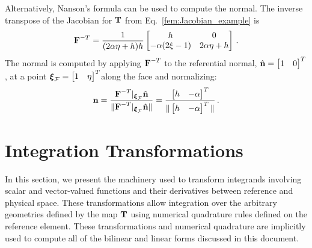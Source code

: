 \documentclass[../doc.tex]{subfiles}
\begin{document}
Alternatively, Nanson's formula can be used to compute the normal. The inverse transpose of the Jacobian for $\boldsymbol{\mathrm{T}}$ from Eq.~\ref{fem:Jacobian_example} is 
	\begin{equation}
		\boldsymbol{\mathrm{F}}^{-T} = \frac{1}{(2\alpha \eta + h)h} \begin{bmatrix} 
			h & 0 \\ 
			-\alpha(2\xi-1) & 2\alpha\eta+h
		\end{bmatrix} \,. 
	\end{equation}
The normal is computed by applying $\boldsymbol{\mathrm{F}}^{-T}$ to the referential normal, $\hat{\boldsymbol{\mathrm{n}}} = \begin{bmatrix} 1&0 \end{bmatrix}^T$, at a point $\boldsymbol{\xi}_\mathcal{F} = \begin{bmatrix} 1 & \eta \end{bmatrix}^T$along the face and normalizing: 
	\begin{equation}
		\boldsymbol{\mathrm{n}} = \frac{\boldsymbol{\mathrm{F}}^{-T}|_{\boldsymbol{\xi}_\mathcal{F}}\hat{\boldsymbol{\mathrm{n}}}}{\|\boldsymbol{\mathrm{F}}^{-T}|_{\boldsymbol{\xi}_\mathcal{F}}\hat{\boldsymbol{\mathrm{n}}}\|} = \frac{\begin{bmatrix} h & -\alpha \end{bmatrix}^T}{\|\begin{bmatrix} h & -\alpha \end{bmatrix}^T\|} \,. 
	\end{equation}

\section{Integration Transformations} \label{fem_sec:int_trans}
In this section, we present the machinery used to transform integrands involving scalar and vector-valued functions and their derivatives between reference and physical space. These transformations allow integration over the arbitrary geometries defined by the map $\boldsymbol{\mathrm{T}}$ using numerical quadrature rules defined on the reference element. These transformations and numerical quadrature are implicitly used to compute all of the bilinear and linear forms discussed in this document. 
\end{document}
